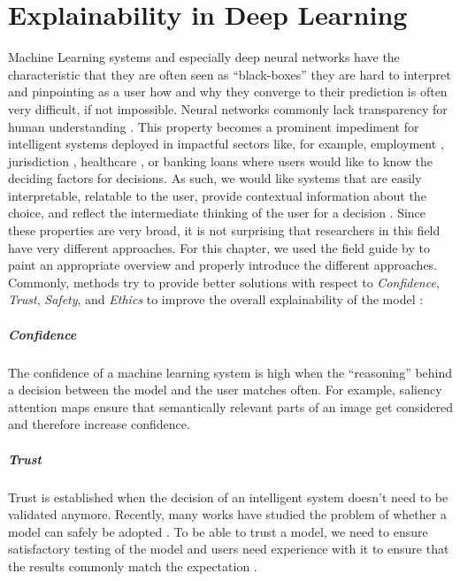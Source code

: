 \chapter{Explainability in Deep Learning} 
\label{sec:Explainability} 

Machine Learning systems and especially deep neural networks have the characteristic that they are often seen as ``black-boxes'' \ie they are hard to interpret and pinpointing as a user how and why they converge to their prediction is often very difficult, if not impossible. Neural networks commonly lack transparency for human understanding \citep{sun2020fixing}. This property becomes a prominent impediment for intelligent systems deployed in impactful sectors like, for example, employment \citep{QinZXZJCX18, CaiSJLQXZ20, ZhaoHCFZ18}, jurisdiction \citep{GuoHQX019}, healthcare \citep{Pasa2019}, or banking loans where users would like to know the deciding factors for decisions. As such, we would like systems that are easily interpretable, relatable to the user, provide contextual information about the choice, and reflect the intermediate thinking of the user for a decision \citep{xie2020explainable}. Since these properties are very broad, it is not surprising that researchers in this field have very different approaches. For this chapter, we used the field guide by \citet{xie2020explainable} to paint an appropriate overview and properly introduce the different approaches. Commonly, methods try to provide better solutions with respect to \emph{Confidence}, \emph{Trust}, \emph{Safety}, and \emph{Ethics} to improve the overall explainability of the model \citep{xie2020explainable}:

\paragraph{Confidence}
The confidence of a machine learning system is high when the ``reasoning'' behind a decision between the model and the user matches often. For example, saliency attention maps \citep{ParkHARSDR18, HudsonM18} ensure that semantically relevant parts of an image get considered and therefore increase confidence.

\paragraph{Trust} 
Trust is established when the decision of an intelligent system doesn't need to be validated anymore. Recently, many works have studied the problem of whether a model can safely be adopted \citep{GharibLBADB18, VarshneyA17, JiangKGG18}. To be able to trust a model, we need to ensure satisfactory testing of the model and users need experience with it to ensure that the results commonly match the expectation \citep{xie2020explainable}.

